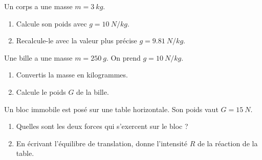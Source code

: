 \documentclass[11pt,a4paper]{article}
\newcommand{\vv}[1]{\vec{#1}}\newcommand{\ds}{\displaystyle}
\begin{document}
\begin{exo}
Un corps a une masse $m=\qty{3}{kg}$.
\begin{enumerate}[label=\alph*)]
  \item Calcule son poids avec $g=\qty{10}{N/kg}$.
  \item Recalcule-le avec la valeur plus précise $g=\qty{9.81}{N/kg}$.
\end{enumerate}
\end{exo}

\begin{exo}
Une bille a une masse $m=\qty{250}{g}$. On prend $g=\qty{10}{N/kg}$.
\begin{enumerate}[label=\alph*)]
  \item Convertis la masse en kilogrammes.
  \item Calcule le poids $G$ de la bille.
\end{enumerate}
\end{exo}

\begin{exo}
Un bloc immobile est posé sur une table horizontale. Son poids vaut $G=\qty{15}{N}$.
\begin{center}
\end{center}
\begin{enumerate}[label=\alph*)]
  \item Quelles sont les deux forces qui s'exercent sur le bloc ?
  \item En écrivant l'équilibre de translation, donne l'intensité $R$ de la réaction de la table.
\end{enumerate}
\end{exo}
\end{document}
